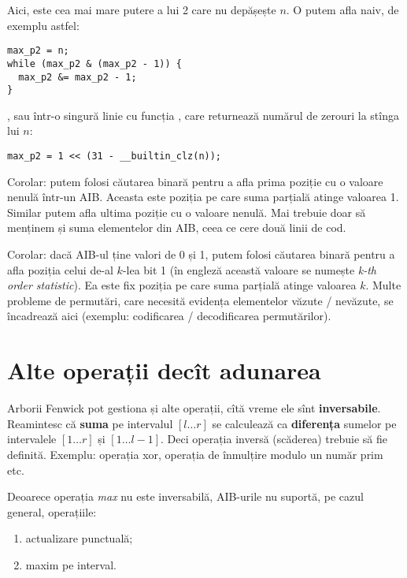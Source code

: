 Aici,  este cea mai mare putere a lui 2 care nu depășește $n$. O putem afla naiv, de exemplu astfel:

\begin{verbatim}
max_p2 = n;
while (max_p2 & (max_p2 - 1)) {
  max_p2 &= max_p2 - 1;
}
\end{verbatim}

, sau într-o singură linie cu funcția , care returnează numărul de zerouri la stînga lui $n$:

\begin{verbatim}
max_p2 = 1 << (31 - __builtin_clz(n));
\end{verbatim}

Corolar: putem folosi căutarea binară pentru a afla prima poziție cu o valoare nenulă într-un AIB. Aceasta este poziția pe care suma parțială atinge valoarea 1. Similar putem afla ultima poziție cu o valoare nenulă. Mai trebuie doar să menținem și suma elementelor din AIB, ceea ce cere două linii de cod.

Corolar: dacă AIB-ul ține valori de 0 și 1, putem folosi căutarea binară pentru a afla poziția celui de-al $k$-lea bit 1 (în engleză această valoare se numește \textit{k-th order statistic}). Ea este fix poziția pe care suma parțială atinge valoarea $k$. Multe probleme de permutări, care necesită evidența elementelor văzute / nevăzute, se încadrează aici (exemplu: codificarea / decodificarea permutărilor).

\section{Alte operații decît adunarea}

Arborii Fenwick pot gestiona și alte operații, cîtă vreme ele sînt \textbf{inversabile}. Reamintesc că \textbf{suma} pe intervalul $[l \dots r]$ se calculează ca \textbf{diferența} sumelor pe intervalele $[1 \dots r]$ și $[1 \dots l-1]$. Deci operația inversă (scăderea) trebuie să fie definită. Exemplu: operația xor, operația de înmulțire modulo un număr prim etc.

Deoarece operația \textit{max} nu este inversabilă, AIB-urile nu suportă, pe cazul general, operațiile:

\begin{enumerate}
  \item actualizare punctuală;
  \item maxim pe interval.
\end{enumerate}

